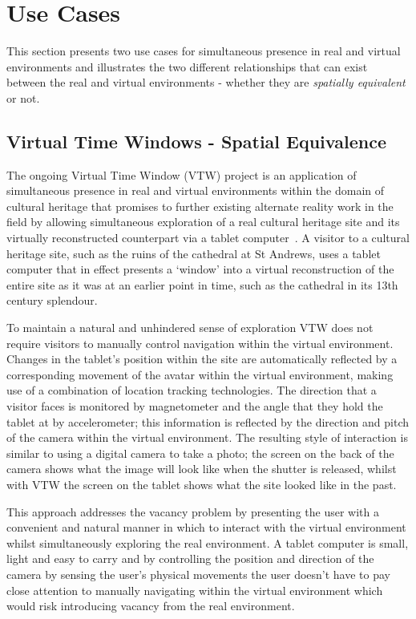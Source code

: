 \section{Use Cases}
This section presents two use cases for simultaneous presence in real and virtual environments and illustrates the two different relationships that can exist between the real and virtual environments - whether they are \textit{spatially equivalent} or not.

\subsection{Virtual Time Windows - Spatial Equivalence}
\label{subsec:vtw}
The ongoing Virtual Time Window (VTW) project is an application of simultaneous presence in real and virtual environments within the domain of cultural heritage that promises to further existing alternate reality work in the field by allowing simultaneous exploration of a real cultural heritage site and its virtually reconstructed counterpart via a tablet computer~\cite{Davies2012}. A visitor to a cultural heritage site, such as the ruins of the cathedral at St Andrews, uses a tablet computer that in effect presents a `window' into a virtual reconstruction of the entire site as it was at an earlier point in time, such as the cathedral in its 13th century splendour.

To maintain a natural and unhindered sense of exploration VTW does not require visitors to manually control navigation within the virtual environment. Changes in the tablet's position within the site are automatically reflected by a corresponding movement of the avatar within the virtual environment, making use of a combination of location tracking technologies. The direction that a visitor faces is monitored by magnetometer and the angle that they hold the tablet at by accelerometer; this information is reflected by the direction and pitch of the camera within the virtual environment. The resulting style of interaction is similar to using a digital camera to take a photo; the screen on the back of the camera shows what the image will look like when the shutter is released, whilst with VTW the screen on the tablet shows what the site looked like in the past.

This approach addresses the vacancy problem by presenting the user with a convenient and natural manner in which to interact with the virtual environment whilst simultaneously exploring the real environment. A tablet computer is small, light and easy to carry and by controlling the position and direction of the camera by sensing the user's physical movements the user doesn't have to pay close attention to manually navigating within the virtual environment which would risk introducing vacancy from the real environment.

